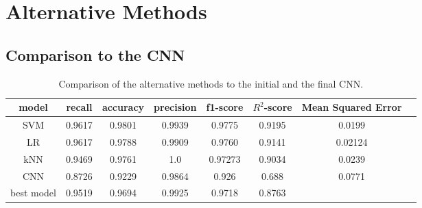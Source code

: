 \chapter{Alternative Methods}
\label{cha:alternative_methods}



\section{Comparison to the CNN}
\label{sec:comparison}

\begin{table}[H]
    \centering
    \caption{Comparison of the alternative methods to the initial and the final CNN.}
    \label{tab:comparisonTable}
    \begin{tabular}{c | c c c c c c c}
        \toprule
        model & recall & accuracy & precision & f1-score & $R^2$-score & Mean Squared Error \\%
        \midrule
        SVM & 0.9617 & 0.9801 & 0.9939 & 0.9775 & 0.9195 & 0.0199 \\
        LR & 0.9617 & 0.9788 & 0.9909 & 0.9760 & 0.9141 & 0.02124 \\
        kNN & 0.9469 & 0.9761 & 1.0 & 0.97273 & 0.9034 & 0.0239 \\
        CNN & 0.8726 & 0.9229 & 0.9864 & 0.926 & 0.688 & 0.0771 \\
        best model & 0.9519 & 0.9694 & 0.9925 & 0.9718 & 0.8763 \\ 
        \bottomrule
    \end{tabular}
\end{table}